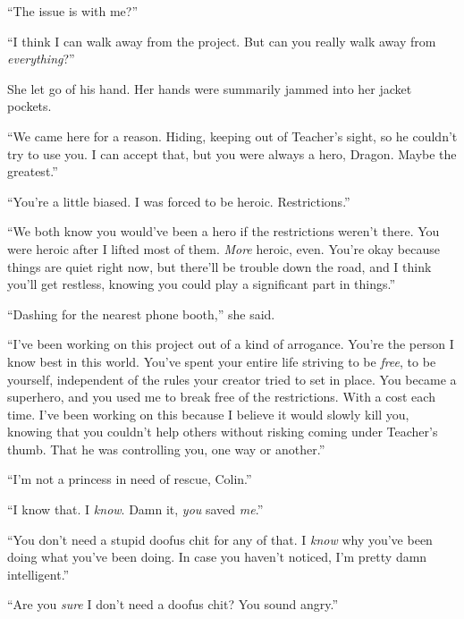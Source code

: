 ``The issue is with me?''



``I think I can walk away from the project.  But can you really walk away from \emph{everything}?''



She let go of his hand.  Her hands were summarily jammed into her jacket pockets.



``We came here for a reason.  Hiding, keeping out of Teacher's sight, so he couldn't try to use you.  I can accept that, but you were always a hero, Dragon.  Maybe the greatest.''



``You're a little biased.  I was forced to be heroic.  Restrictions.''



``We both know you would've been a hero if the restrictions weren't there.  You were heroic after I lifted most of them.  \emph{More} heroic, even.  You're okay because things are quiet right now, but there'll be trouble down the road, and I think you'll get restless, knowing you could play a significant part in things.''



``Dashing for the nearest phone booth,'' she said.



``I've been working on this project out of a kind of arrogance.  You're the person I know best in this world.  You've spent your entire life striving to be \emph{free}, to be yourself, independent of the rules your creator tried to set in place.  You became a superhero, and you used me to break free of the restrictions.  With a cost each time.  I've been working on this because I believe it would slowly kill you, knowing that you couldn't help others without risking coming under Teacher's thumb.  That he was controlling you, one way or another.''



``I'm not a princess in need of rescue, Colin.''



``I know that.  I \emph{know}.  Damn it, \emph{you} saved \emph{me}.''



``You don't need a stupid doofus chit for any of that.  I \emph{know} why you've been doing what you've been doing.  In case you haven't noticed, I'm pretty damn intelligent.''



``Are you \emph{sure} I don't need a doofus chit?  You sound angry.''



